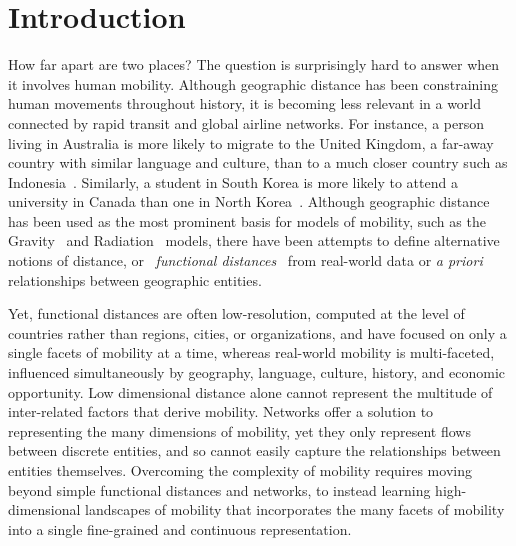 \documentclass[12pt]{article} %
\begin{document}
%
%
\section{Introduction}\label{sec:introduction} %


How far apart are two places?
The question is surprisingly hard to answer when it involves human mobility.
Although geographic distance has been constraining human movements throughout history, it is becoming less relevant in a world connected by rapid transit and global airline networks.
For instance, a person living in Australia is more likely to migrate to the United Kingdom, a far-away country with similar language and culture, than to a much closer country such as Indonesia~\autocite{pew2018migration}.
Similarly, a student in South Korea is more likely to attend a university in Canada than one in North Korea~\autocite{unesco2019students}.
Although geographic distance has been used as the most prominent basis for models of mobility, such as the Gravity~\autocite{zipf1946gravity} and Radiation~\autocite{simini2012universal} models, there have been attempts to define alternative notions of distance, or ~\textit{functional distances}~\autocite{boschma2005proximity, brown1970functional, brown1970migration, kim2018functional} from real-world data or \textit{a priori} relationships between geographic entities.

Yet, functional distances are often low-resolution, computed at the level of countries rather than regions, cities, or organizations, and have focused on only a single facets of mobility at a time, whereas real-world mobility is multi-faceted, influenced simultaneously by geography, language, culture, history, and economic opportunity.  
Low dimensional distance alone cannot represent the multitude of inter-related factors that derive mobility. 
Networks offer a solution to representing the many dimensions of mobility, yet they only represent flows between discrete entities, and so cannot easily capture the relationships between entities themselves. 
Overcoming the complexity of mobility requires moving beyond simple functional distances and networks, to instead learning high-dimensional landscapes of mobility that incorporates the many facets of mobility into a single fine-grained and continuous representation. 
			
\end{document}
